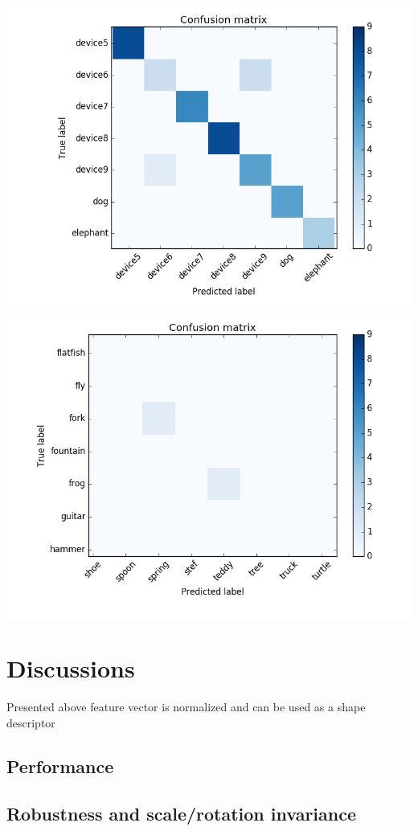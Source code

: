 \documentclass[12pt]{article}
\begin{document}
\includegraphics[scale=0.4]{device.png} 
\includegraphics[scale=0.4]{fork_fish.png} 

\section{Discussions}
Presented above feature vector is normalized and can be used as a shape descriptor  

\subsection{Performance}
\subsection{Robustness and scale/rotation invariance}



\end{document}
